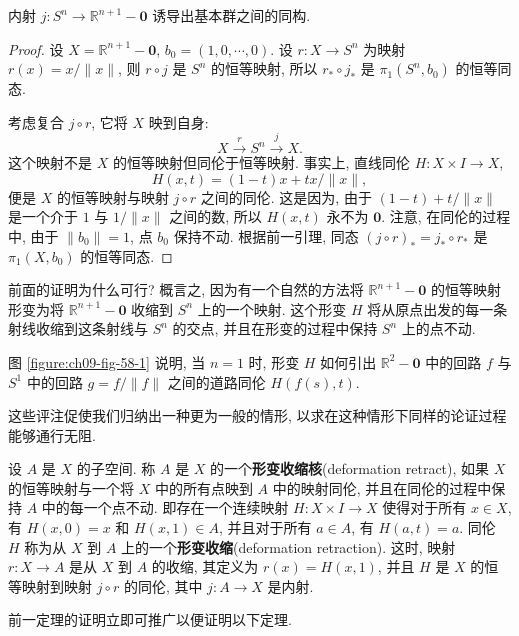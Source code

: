 \begin{theorem}
\label{theorem:ch09-sec58-58-2}
内射 $j\colon S^{n}\to\mathbb{R}^{n+1}-\boldsymbol{0}$ 诱导出基本群之间的同构.
\end{theorem}

\begin{proof}
设 $X=\mathbb{R}^{n+1}-\boldsymbol{0}$, $b_0=(1,0,\cdots,0)$. 设 $r\colon X\to S^{n}$ 为映射 $r(x)=x/\|x\|$, 则 $r\circ j$ 是 $S^{n}$ 的恒等映射, 所以 $r_*\circ j_*$ 是 $\pi_1(S^{n},b_0)$ 的恒等同态.

考虑复合 $j\circ r$, 它将 $X$ 映到自身:
\[
X\xrightarrow{r}S^{n}\xrightarrow{j}X.
\]
这个映射不是 $X$ 的恒等映射但同伦于恒等映射. 事实上, 直线同伦 $H\colon X\times I\to X$,
\[
H(x,t)=(1-t)x+tx/\|x\|,
\]
便是 $X$ 的恒等映射与映射 $j\circ r$ 之间的同伦. 这是因为, 由于 $(1-t)+t/\|x\|$ 是一个介于 $1$ 与 $1/\|x\|$ 之间的数, 所以 $H(x,t)$ 永不为 $\boldsymbol{0}$. 注意, 在同伦的过程中, 由于 $\|b_0\|=1$, 点 $b_0$ 保持不动. 根据前一引理, 同态 $(j\circ r)_*=j_*\circ r_*$ 是 $\pi_1(X,b_0)$ 的恒等同态.
\end{proof}


前面的证明为什么可行? 概言之, 因为有一个自然的方法将 $\mathbb{R}^{n+1}-\boldsymbol{0}$ 的恒等映射形变为将 $\mathbb{R}^{n+1}-\boldsymbol{0}$ 收缩到 $S^{n}$ 上的一个映射. 这个形变 $H$ 将从原点出发的每一条射线收缩到这条射线与 $S^{n}$ 的交点, 并且在形变的过程中保持 $S^{n}$ 上的点不动.

图 \cref{figure:ch09-fig-58-1} 说明, 当 $n=1$ 时, 形变 $H$ 如何引出 $\mathbb{R}^{2}-\boldsymbol{0}$ 中的回路 $f$ 与 $S^{1}$ 中的回路 $g=f/\|f\|$ 之间的道路同伦 $H(f(s),t)$.

这些评注促使我们归纳出一种更为一般的情形, 以求在这种情形下同样的论证过程能够通行无阻.

\begin{definition}[形变收缩核]
\label{definition:ch09-sec58-defretract}
设 $A$ 是 $X$ 的子空间. 称 $A$ 是 $X$ 的一个\textbf{形变收缩核}(deformation retract), 如果 $X$ 的恒等映射与一个将 $X$ 中的所有点映到 $A$ 中的映射同伦, 并且在同伦的过程中保持 $A$ 中的每一个点不动. 即存在一个连续映射 $H\colon X\times I\to X$ 使得对于所有 $x\in X$, 有 $H(x,0)=x$ 和 $H(x,1)\in A$, 并且对于所有 $a\in A$, 有 $H(a,t)=a$. 同伦 $H$ 称为从 $X$ 到 $A$ 上的一个\textbf{形变收缩}(deformation retraction). 这时, 映射 $r\colon X\to A$ 是从 $X$ 到 $A$ 的收缩, 其定义为 $r(x)=H(x,1)$, 并且 $H$ 是 $X$ 的恒等映射到映射 $j\circ r$ 的同伦, 其中 $j\colon A\to X$ 是内射.
\end{definition}

前一定理的证明立即可推广以便证明以下定理.


